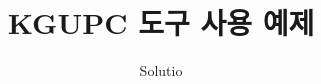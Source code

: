 \documentclass[11pt]{article}
\title{KGUPC 도구 사용 예제}
\author{Solutio}
\date{}
\begin{document}
\problemsetfrontmatter

\checkselectedproblem
\end{document}

